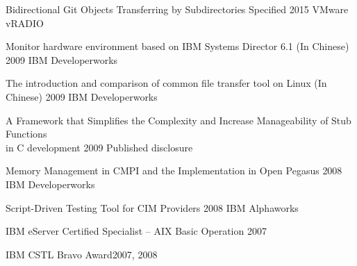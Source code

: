 \documentclass[10pt,letterpaper]{article}
\begin{document}

\spacedhrule{1.6em}{-0.4em} %



\headedsubsection
{Bidirectional Git Objects Transferring by Subdirectories Specified}
{2015 VMware vRADIO}
{}

\headedsubsection
{Monitor hardware environment based on IBM Systems Director 6.1 (In Chinese)}
{2009 IBM Developerworks}
{}

\headedsubsection
{The introduction and comparison of common file transfer tool on Linux (In
Chinese)}
{2009 IBM Developerworks}
{}

\headedsubsection
{A Framework that Simplifies the Complexity and Increase Manageability
of Stub Functions \\
in C development}
{2009 Published disclosure}
{}

\headedsubsection
{Memory Management in CMPI and the Implementation in Open Pegasus}
{2008 IBM Developerworks}
{}

\headedsubsection
{Script-Driven Testing Tool for CIM Providers}
{2008 IBM Alphaworks}
{}

\headedsubsection
{IBM eServer Certified Specialist -- AIX Basic Operation} {2007}{}

\headedsubsection
{IBM CSTL Bravo Award}{2007, 2008}{}
\end{document}
